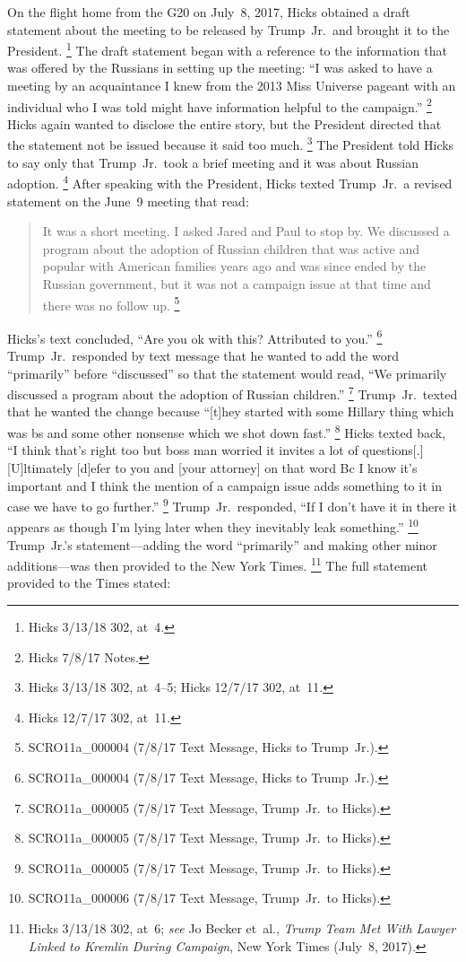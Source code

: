 On the flight home from the G20 on July~8, 2017, Hicks obtained a draft statement about the meeting to be released by Trump~Jr.\ and brought it to the President.%
\footnote{Hicks 3/13/18 302, at~4.}
The draft statement began with a reference to the information that was offered by the Russians in setting up the meeting: ``I was asked to have a meeting by an acquaintance I knew from the 2013 Miss Universe pageant with an individual who I was told might have information helpful to the campaign.''%
\footnote{Hicks 7/8/17 Notes.}
Hicks again wanted to disclose the entire story, but the President directed that the statement not be
issued because it said too much.%
\footnote{Hicks 3/13/18 302, at~4--5;
Hicks 12/7/17 302, at~11.}
The President told Hicks to say only that Trump~Jr.\ took a brief meeting and it was about Russian adoption.%
\footnote{Hicks 12/7/17 302, at~11.}
After speaking with the President, Hicks texted Trump~Jr.\ a revised statement on the June~9 meeting that read:

\begin{quote}
It was a short meeting.
I asked Jared and Paul to stop by.
We discussed a program about the adoption of Russian children that was active and popular with American families years ago and was since ended by the Russian government, but it was not a campaign issue at that time and there was no follow up.%
\footnote{SCRO11a\_000004 (7/8/17 Text Message, Hicks to Trump~Jr.).}
\end{quote}

Hicks's text concluded, ``Are you ok with this? Attributed to you.''%
\footnote{SCRO11a\_000004 (7/8/17 Text Message, Hicks to Trump~Jr.).}
Trump~Jr.\ responded by text message that he wanted to add the word ``primarily'' before ``discussed'' so that the statement would read, ``We primarily discussed a program about the adoption of Russian children.''%
\footnote{SCRO11a\_000005 (7/8/17 Text Message, Trump~Jr.\ to Hicks).}
Trump~Jr.\ texted that he wanted the change because ``[t]hey started with some Hillary thing which was bs and some other nonsense which we shot down fast.''%
\footnote{SCRO11a\_000005 (7/8/17 Text Message, Trump~Jr.\ to Hicks).}
Hicks texted back, ``I think that's right too but boss man worried it invites a lot of questions[.]
[U]ltimately [d]efer to you and [your attorney] on that word Bc I know it's important and I think the mention of a campaign issue adds something to it in case we have to go further.''%
\footnote{SCRO11a\_000005 (7/8/17 Text Message, Trump~Jr.\ to Hicks).}
Trump~Jr.\ responded, ``If I don't have it in there it appears as though I'm lying later when they inevitably leak something.''%
\footnote{SCRO11a\_000006 (7/8/17 Text Message, Trump~Jr.\ to Hicks).}
Trump~Jr.'s statement---adding the word ``primarily'' and making other minor additions---was then provided to the New York Times.%
\footnote{Hicks 3/13/18 302, at~6;
\textit{see} Jo Becker et~al., \textit{Trump Team Met With Lawyer Linked to Kremlin During Campaign}, New York Times (July~8, 2017).}
The full statement provided to the Times stated:

